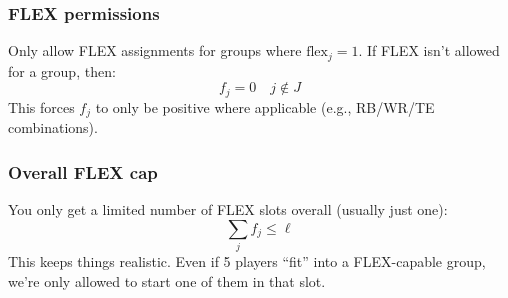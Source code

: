 \documentclass{article}
\begin{document}
\subsubsection*{FLEX permissions}
Only allow FLEX assignments for groups where \( \text{flex}_j = 1 \). If FLEX isn't allowed for a group, then:
\[
f_j = 0 \quad j \not\in J
\]
This forces \( f_j \) to only be positive where applicable (e.g., RB/WR/TE combinations).

\subsubsection*{Overall FLEX cap}
You only get a limited number of FLEX slots overall (usually just one):
\[
\sum_j f_j  \leq \ell
\]
This keeps things realistic. Even if 5 players “fit” into a FLEX-capable group, we're only allowed to start one of them in that slot.
\end{document}
